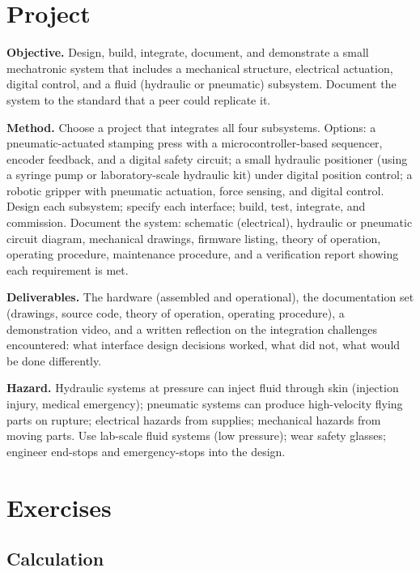 \section{Project}

\begin{project}
\textbf{Objective.} Design, build, integrate, document, and demonstrate a small mechatronic system that includes a mechanical structure, electrical actuation, digital control, and a fluid (hydraulic or pneumatic) subsystem. Document the system to the standard that a peer could replicate it.

\textbf{Method.} Choose a project that integrates all four subsystems. Options: a pneumatic-actuated stamping press with a microcontroller-based sequencer, encoder feedback, and a digital safety circuit; a small hydraulic positioner (using a syringe pump or laboratory-scale hydraulic kit) under digital position control; a robotic gripper with pneumatic actuation, force sensing, and digital control. Design each subsystem; specify each interface; build, test, integrate, and commission. Document the system: schematic (electrical), hydraulic or pneumatic circuit diagram, mechanical drawings, firmware listing, theory of operation, operating procedure, maintenance procedure, and a verification report showing each requirement is met.

\textbf{Deliverables.} The hardware (assembled and operational), the documentation set (drawings, source code, theory of operation, operating procedure), a demonstration video, and a written reflection on the integration challenges encountered: what interface design decisions worked, what did not, what would be done differently.

\textbf{Hazard.} Hydraulic systems at pressure can inject fluid through skin (injection injury, medical emergency); pneumatic systems can produce high-velocity flying parts on rupture; electrical hazards from supplies; mechanical hazards from moving parts. Use lab-scale fluid systems (low pressure); wear safety glasses; engineer end-stops and emergency-stops into the design.
\end{project}

\section{Exercises}

\subsection*{Calculation}

